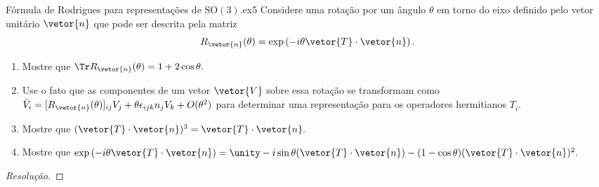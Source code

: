 \begin{exercício}{Fórmula de Rodrigues para representações de \(\mathrm{SO}(3).\)}{ex5}
   Considere uma rotação por um ângulo \(\theta\) em torno do eixo definido pelo vetor unitário \(\vetor{n}\) que pode ser descrita pela matriz
   \begin{equation*}
      R_{\vetor{n}}(\theta) = \exp\left(-i\theta \vetor{T}\cdot \vetor{n}\right).
   \end{equation*}
   \begin{enumerate}[label=(\alph*)]
      \item Mostre que \(\Tr R_{\vetor{n}}(\theta) = 1 + 2 \cos\theta.\)
      \item Use o fato que as componentes de um vetor \(\vetor{V}\) sobre essa rotação se transformam como \(\tilde{V}_i = [R_{\vetor{n}}(\theta)]_{ij} V_j + \theta \epsilon_{ijk} n_j V_k + O(\theta^2)\) para determinar uma representação para os operadores hermitianos \(T_i\).
      \item Mostre que \((\vetor{T}\cdot \vetor{n})^3 = \vetor{T}\cdot \vetor{n}.\)
      \item Mostre que \(\exp\left(-i\theta\vetor{T}\cdot\vetor{n}\right) = \unity - i \sin\theta (\vetor{T} \cdot \vetor{n}) - (1 - \cos\theta) (\vetor{T}\cdot \vetor{n})^2.\)
   \end{enumerate}
\end{exercício}
\begin{proof}[Resolução]
    
\end{proof}
